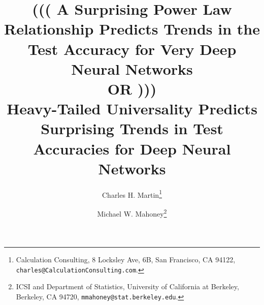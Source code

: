 \documentclass[11pt]{article}
\begin{document}
\title{%
(((
A Surprising Power Law Relationship Predicts Trends in the Test Accuracy for Very Deep Neural Networks
\\ OR )))\\ 
Heavy-Tailed Universality Predicts Surprising Trends in Test Accuracies for Deep Neural Networks
}

\author{%
Charles H. Martin\thanks{Calculation Consulting, 8 Locksley Ave, 6B, San Francisco, CA 94122, \texttt{charles@CalculationConsulting.com}.} 
\and 
Michael W. Mahoney\thanks{ICSI and Department of Statistics, University of California at Berkeley, Berkeley, CA 94720, \texttt{mmahoney@stat.berkeley.edu}.}
}


\date{}
\maketitle








%


{\small
%
%

}

\appendix

\end{document}
